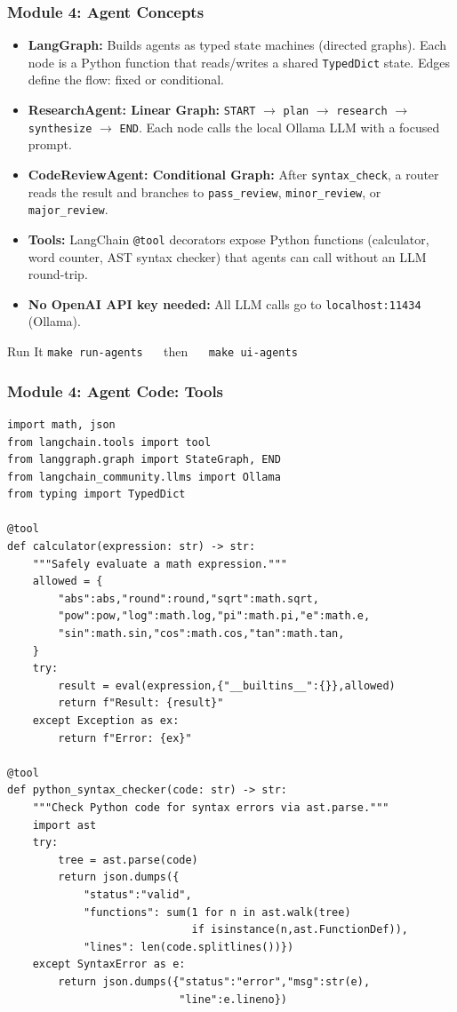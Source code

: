 \begin{frame}[fragile]\frametitle{Module 4: Agent Concepts}
\begin{itemize}
  \item \textbf{LangGraph:} Builds agents as typed state machines (directed graphs). Each node is a Python function that reads/writes a shared \texttt{TypedDict} state. Edges define the flow: fixed or conditional.
  \item \textbf{ResearchAgent: Linear Graph:} \texttt{START} $\to$ \texttt{plan} $\to$ \texttt{research} $\to$ \texttt{synthesize} $\to$ \texttt{END}. Each node calls the local Ollama LLM with a focused prompt.
  \item \textbf{CodeReviewAgent: Conditional Graph:} After \texttt{syntax\_check}, a router reads the result and branches to \texttt{pass\_review}, \texttt{minor\_review}, or \texttt{major\_review}.
  \item \textbf{Tools:} LangChain \texttt{@tool} decorators expose Python functions (calculator, word counter, AST syntax checker) that agents can call without an LLM round-trip.
  \item \textbf{No OpenAI API key needed:} All LLM calls go to \texttt{localhost:11434} (Ollama).
\end{itemize}
\begin{block}{Run It}
  \texttt{make run-agents} $\quad$ then $\quad$ \texttt{make ui-agents}
\end{block}
\end{frame}

\begin{frame}[fragile]\frametitle{Module 4: Agent Code: Tools}
\begin{lstlisting}
import math, json
from langchain.tools import tool
from langgraph.graph import StateGraph, END
from langchain_community.llms import Ollama
from typing import TypedDict

@tool
def calculator(expression: str) -> str:
    """Safely evaluate a math expression."""
    allowed = {
        "abs":abs,"round":round,"sqrt":math.sqrt,
        "pow":pow,"log":math.log,"pi":math.pi,"e":math.e,
        "sin":math.sin,"cos":math.cos,"tan":math.tan,
    }
    try:
        result = eval(expression,{"__builtins__":{}},allowed)
        return f"Result: {result}"
    except Exception as ex:
        return f"Error: {ex}"

@tool
def python_syntax_checker(code: str) -> str:
    """Check Python code for syntax errors via ast.parse."""
    import ast
    try:
        tree = ast.parse(code)
        return json.dumps({
            "status":"valid",
            "functions": sum(1 for n in ast.walk(tree)
                             if isinstance(n,ast.FunctionDef)),
            "lines": len(code.splitlines())})
    except SyntaxError as e:
        return json.dumps({"status":"error","msg":str(e),
                           "line":e.lineno})
\end{lstlisting}
\end{frame}

